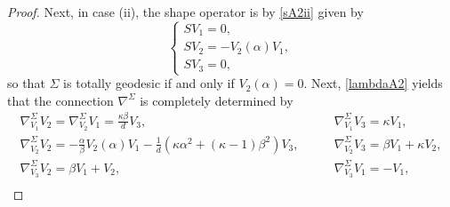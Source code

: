 \documentclass{amsart}
\theoremstyle{plain}
\theoremstyle{remark}
\begin{document}
{\begin{proof}
Next, in case (ii), the shape operator is by \eqref{sA2ii} given by
%
\begin{equation*}
\left\{
\begin{array}{l}
SV_1 =  0, \\[2 pt]
SV_2 =  - V_2(\alpha)V_1, \\[2 pt]
SV_3 =  0,
\end{array}
\right.
\end{equation*}
%
so that $\Sigma$ is totally geodesic if and only if $V_2(\alpha)=0$. Next, \eqref{lambdaA2} yields that the connection $\nabla^{\Sigma}$ is completely determined by
%
\[%
\begin{array}{ll}
\nabla^\Sigma _{V_1} V_2 = \nabla^\Sigma _{V_2} V_1 = \frac{\kappa \beta}{d} V_3, \qquad &
\nabla^\Sigma _{V_1} V_3 = \kappa V_1, \\[6 pt]
\nabla^\Sigma _{V_2} V_2 =-\frac{\alpha}{\beta}V_2(\alpha) V_1- \frac 1d \left(\kappa \alpha^2+(\kappa-1)\beta ^2 \right)V_3, \qquad &
\nabla^\Sigma _{V_2} V_3 = \beta V_1+\kappa V_2, \\[6 pt]
\nabla^\Sigma _{V_3} V_2 = \beta V_1+V_2,\qquad &
\nabla^\Sigma _{V_3} V_1 = -V_1, \\[6 pt]
\end{array}
\]


\end{proof}}
\end{document}
